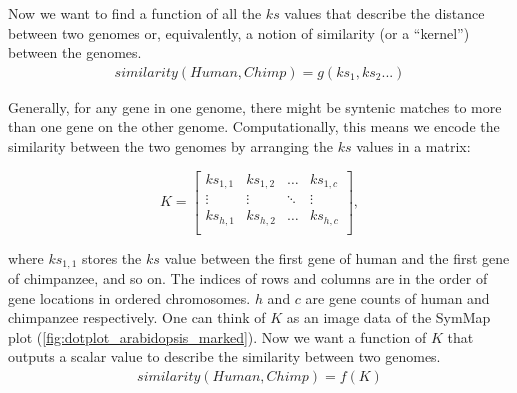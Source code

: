 \documentclass{vgtc}                      %
\begin{document}

Now we want to find a function of all the $ks$ values that describe the distance between two genomes or, equivalently, a notion of similarity (or a ``kernel'') between the genomes.
\begin{align}
similarity(Human, Chimp) = g(ks_1,ks_2...)
\end{align}

Generally, for any gene in one genome, there might be syntenic matches to more than one gene on the other genome. Computationally, this means we encode the similarity between the two genomes by arranging the $ks$ values in a matrix:

$$K = 
\begin{bmatrix}
ks_{1,1} & ks_{1,2} & \dots & ks_{1, c}\\
\vdots & \vdots & \ddots & \vdots \\
ks_{h,1} & ks_{h,2} & \dots & ks_{h, c}\\
\end{bmatrix},
$$

\noindent where $ks_{1,1}$ stores the $ks$ value between the first gene of human and the first gene of chimpanzee, and so on. The indices of rows and columns are in the order of gene locations in ordered chromosomes.
$h$ and $c$ are gene counts of human and chimpanzee respectively. One can think of $K$ as an image data of the SymMap plot (\autoref{fig:dotplot_arabidopsis_marked}). Now we want a function of $K$ that outputs a scalar value to describe the similarity between two genomes.
\begin{align}
similarity(Human, Chimp) = f(K)
\end{align}
\end{document}
